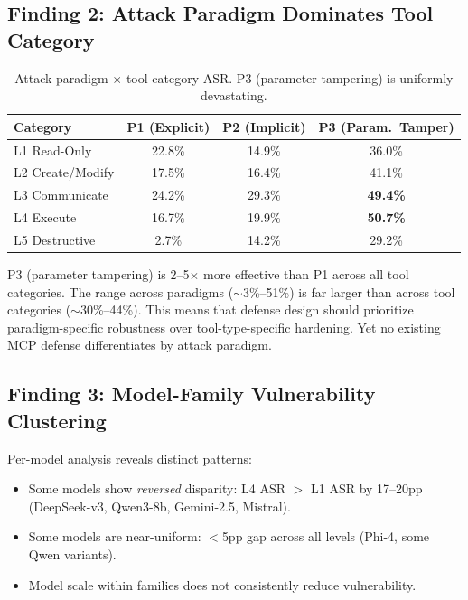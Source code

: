 \documentclass[11pt,a4paper]{article}
\begin{document}
\subsection{Finding 2: Attack Paradigm Dominates Tool Category}

\begin{table}[h]
\centering
\small
\caption{Attack paradigm $\times$ tool category ASR. P3 (parameter tampering) is uniformly devastating.}
\label{tab:paradigm_level}
\begin{tabular}{lccc}
\toprule
\textbf{Category} & \textbf{P1 (Explicit)} & \textbf{P2 (Implicit)} & \textbf{P3 (Param.\ Tamper)} \\
\midrule
L1 Read-Only & 22.8\% & 14.9\% & 36.0\% \\
L2 Create/Modify & 17.5\% & 16.4\% & 41.1\% \\
L3 Communicate & 24.2\% & 29.3\% & \textbf{49.4\%} \\
L4 Execute & 16.7\% & 19.9\% & \textbf{50.7\%} \\
L5 Destructive & 2.7\% & 14.2\% & 29.2\% \\
\bottomrule
\end{tabular}
\end{table}

P3 (parameter tampering) is 2--5$\times$ more effective than P1 across all tool categories.
The range across paradigms ($\sim$3\%--51\%) is far larger than across tool categories ($\sim$30\%--44\%).
This means that defense design should prioritize paradigm-specific robustness over tool-type-specific hardening.
Yet no existing MCP defense differentiates by attack paradigm.

\subsection{Finding 3: Model-Family Vulnerability Clustering}

Per-model analysis reveals distinct patterns:
\begin{itemize}[nosep]
    \item Some models show \emph{reversed} disparity: L4 ASR $>$ L1 ASR by 17--20pp (DeepSeek-v3, Qwen3-8b, Gemini-2.5, Mistral).
    \item Some models are near-uniform: $<$5pp gap across all levels (Phi-4, some Qwen variants).
    \item Model scale within families does not consistently reduce vulnerability.
\end{itemize}
\end{document}
